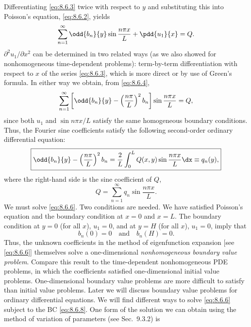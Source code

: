 Differentiating \eqref{eq:8.6.3} twice with respect to $y$ and substituting this into Poisson's equation, \eqref{eq:8.6.2}, yields
\begin{equation}
\label{eq:8.6.4}
\sum_{n=1}^{\infty} \odd{b_n}{y}\sin\frac{n\pi x}{L} + \pdd{u_1}{x} = Q.
\end{equation}
$\partial^2 u_1/\partial x^2$ can be determined in two related ways (as we also showed for nonhomogeneous time-dependent problems): term-by-term differentiation with respect to $x$ of the series \eqref{eq:8.6.3}, which is more direct or by use of Green's formula.  In either way we obtain, from \eqref{eq:8.6.4},
\begin{equation}
\label{eq:8.6.5}
\sum_{n=1}^{\infty} \left[\odd{b_n}{y} - \left(\frac{n\pi}{L}\right)^2 b_n\right]\sin\frac{n\pi x}{L} = Q,
\end{equation}
since both $u_1$ and $\sin n\pi x/L$ satisfy the same homogeneous boundary conditions.  Thus, the Fourier sine coefficients satisfy the following second-order ordinary differential equation:
\begin{equation}
\label{eq:8.6.6}
\boxed{\odd{b_n}{y} - \left(\frac{n\pi}{L}\right)^2 b_n = \frac{2}{L}\int_0^L Q(x,y)\sin\frac{n\pi x}{L}\dx \equiv q_n(y),}
\end{equation}
where the right-hand side is the sine coefficient of $Q$,
\begin{equation}
\label{eq:8.6.7}
Q = \sum_{n=1}^{\infty} q_n\sin\frac{n\pi x}{L}.
\end{equation}
We must solve \eqref{eq:8.6.6}.  Two conditions are needed.  We have satisfied Poisson's equation and the boundary condition at $x=0$ and $x=L$.  The boundary condition at $y=0$ (for all $x$), $u_1 = 0$, and at $y=H$ (for all $x$), $u_1 = 0$, imply that
\begin{equation}
\label{eq:8.6.8}
b_n(0) = 0 \quad\text{and}\quad b_n(H) = 0.
\end{equation}
Thus, the unknown coefficients in the method of eigenfunction expansion [see \eqref{eq:8.6.6}] themselves solve a one-dimensional \emph{nonhomogeneous boundary value problem}.  Compare this result to the time-dependent nonhomogeneous PDE problems, in which the coefficients satisfied one-dimensional initial value problems.  One-dimensional boundary value problems are more difficult to satisfy than initial value problems.  Later we will discuss boundary value problems for ordinary differential equations.  We will find different ways to solve \eqref{eq:8.6.6} subject to the BC \eqref{eq:8.6.8}.  One form of the solution we can obtain using the method of variation of parameters (see Sec.~9.3.2) is
